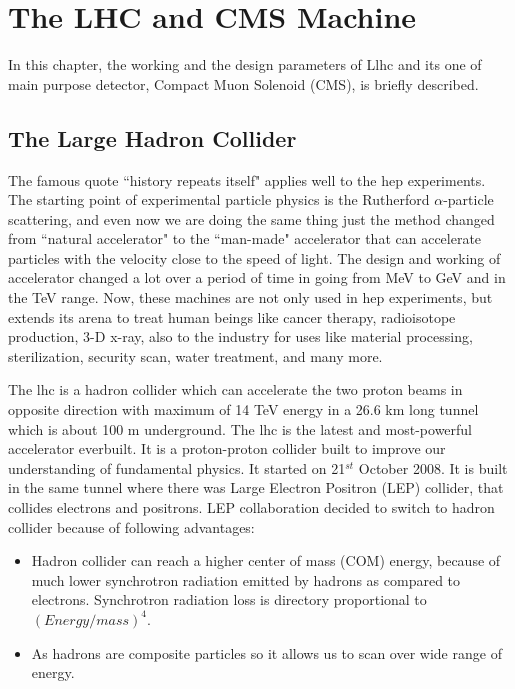 \chapter{The LHC and CMS Machine} %
\label{cha:the_lhc_and_cms_machine}

In this chapter, the working and the design parameters of L\acrfull{lhc} and its one of main purpose detector, Compact Muon Solenoid (CMS), is briefly described.


\section{The Large Hadron Collider} %
\label{sec:the_large_hadron_collider}

The famous quote ``history repeats itself" applies well to the \acrfull{hep} experiments. The starting point of experimental particle physics is the Rutherford $\alpha$-particle scattering, and even now we are doing the same thing just the method changed from ``natural accelerator" to the ``man-made" accelerator that can accelerate particles with the velocity close to the speed of light. The design and working of accelerator changed a lot over a period of time in going from MeV to GeV and in the TeV range. Now, these machines are not only used in \acrshort{hep} experiments, but extends its arena to treat human beings like cancer therapy, radioisotope production, 3-D x-ray, also to the industry for uses like material processing, sterilization, security scan, water treatment, and many more. 

The \acrshort{lhc} is  a hadron collider which can accelerate the two proton beams in opposite direction with maximum of 14 TeV energy in a 26.6 km long tunnel which is about 100 m underground. The \acrshort{lhc} is the latest and most-powerful accelerator everbuilt. It is a proton-proton collider built to improve our understanding of fundamental physics. It started on 21$^{st}$ October 2008. It is built in the same tunnel where there was Large Electron Positron (LEP) collider, that collides electrons and positrons. LEP collaboration decided to switch to hadron collider because of following advantages:
\begin{itemize}
    \item Hadron collider can reach a higher center of mass (COM) energy, because of much lower synchrotron radiation emitted by hadrons as compared to electrons. Synchrotron radiation loss is directory proportional to $(Energy/mass)^4$. 
    \item As hadrons are composite particles so it allows us to scan over wide range of energy.
\end{itemize}


